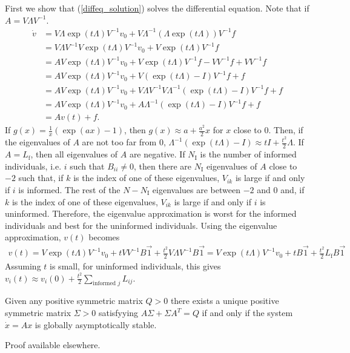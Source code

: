 \documentclass{article}
\begin{document}
\begin{pf}
First we show that (\ref{diffeq_solution}) solves the differential equation. Note that if $A=V\Lambda V^{-1}$.
\begin{align*}
\dot{v}&=V\Lambda \exp(t\Lambda)V^{-1}v_0+V\Lambda^{-1}(\Lambda\exp(t\Lambda))V^{-1}f
\\&=V\Lambda V^{-1}V\exp(t\Lambda)V^{-1}v_0+V\exp(t\Lambda)V^{-1}f
\\&=AV\exp(t\Lambda)V^{-1}v_0+V\exp(t\Lambda)V^{-1}f-VV^{-1}f+VV^{-1}f
\\&=AV\exp(t\Lambda)V^{-1}v_0+V(\exp(t\Lambda)-I)V^{-1}f+f
\\&=AV\exp(t\Lambda)V^{-1}v_0+V\Lambda V^{-1}V \Lambda^{-1}(\exp(t\Lambda)-I)V^{-1}f+f
\\&=AV\exp(t\Lambda)V^{-1}v_0+A\Lambda^{-1}(\exp(t\Lambda)-I)V^{-1}f+f
\\&=Av(t)+f.
\end{align*}
If $g(x)=\frac{1}{x}(\exp(ax)-1)$, then $g(x)\approx a+\frac{a^2}{2}x$ for $x$ close to $0$. Then, if the eigenvalues of $A$ are not too far from $0$, $\Lambda^{-1}(\exp(t\Lambda)-I)\approx  tI+\frac{t^2}{2}\Lambda$.  If $A=L_\text{f}$, then all eigenvalues of $A$ are negative.  If $N_\text{I}$ is the number of informed individuals, i.e. $i$ such that $B_{ii}\neq0$, then there are $N_\text{I}$ eigenvalues of $A$ close to $-2$ such that, if  $k$ is the index of one of these eigenvalues, $V_{ik}$ is large if and only if $i$ is informed.  The rest of the $N-N_\text{I}$ eigenvalues are between $-2$ and $0$ and, if $k$ is the index of one of these eigenvalues, $V_{ik}$ is large if and only if $i$ is uninformed. 
Therefore, the eigenvalue approximation is worst for the informed individuals and best for the uninformed individuals. Using the eigenvalue approximation, $v(t)$ becomes 
\begin{align*}
v(t)=V\exp(t\Lambda)V^{-1}v_0+tVV^{-1}B\vec{1}+\frac{t^2}{2}V\Lambda V^{-1}B\vec{1}=V\exp(t\Lambda)V^{-1}v_0+tB\vec{1}+\frac{t^2}{2}L_\text{f}B\vec{1}
\end{align*}
Assuming $t$ is small, for uninformed individuals, this gives $v_i(t)\approx v_i(0)+ \frac{t^2}{2}\sum_{\text{informed } j}L_{ij}$.
\end{pf}

\begin{theorem} \label{lyapeq_theorem}
Given any positive symmetric matrix $Q>0$ there exists a unique positive symmetric matrix $\Sigma>0$ satisfyying $A\Sigma+\Sigma A^T=Q$ if and only if the system $\dot{x}=Ax$ is globally asymptotically stable.
\end{theorem}
\begin{pf}
Proof available elsewhere.
\end{pf}
\end{document}
